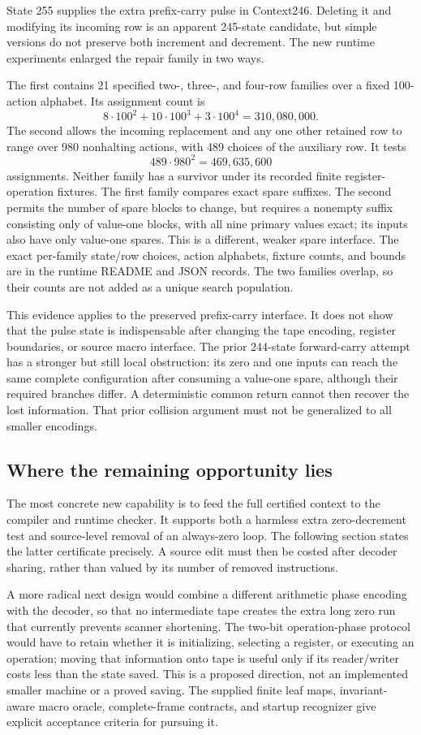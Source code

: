 State 255 supplies the extra prefix-carry pulse in Context246. Deleting
it and modifying its incoming row is an apparent 245-state candidate,
but simple versions do not preserve both increment and decrement. The
new runtime experiments enlarged the repair family in two ways.

The first contains 21 specified two-, three-, and four-row families
over a fixed 100-action alphabet. Its assignment count is
\[
 8\cdot100^2+10\cdot100^3+3\cdot100^4
 =310,080,000.
\]
The second allows the incoming replacement and any one other retained
row to range over 980 nonhalting actions, with 489 choices of the
auxiliary row. It tests
\[
 489\cdot980^2=469,635,600
\]
assignments. Neither family has a survivor under its recorded finite
register-operation fixtures. The first family compares exact spare
suffixes. The second permits the number of spare blocks to change,
but requires a nonempty suffix consisting only of value-one blocks,
with all nine primary values exact; its inputs also have only
value-one spares. This is a different, weaker spare interface. The exact
per-family state/row choices, action alphabets, fixture counts, and
bounds are in the runtime README and JSON records. The two families
overlap, so their counts are not added as a unique search population.

This evidence applies to the preserved prefix-carry interface. It
does not show that the pulse state is indispensable after changing
the tape encoding, register boundaries, or source macro interface.
The prior 244-state forward-carry attempt has a stronger but still
local obstruction: its zero and one inputs can reach the same complete
configuration after consuming a value-one spare, although their
required branches differ. A deterministic common return cannot then
recover the lost information. That prior collision argument must not
be generalized to all smaller encodings.

\subsection{Where the remaining opportunity lies}

The most concrete new capability is to feed the full certified context
to the compiler and runtime checker. It supports both a harmless extra
zero-decrement test and source-level removal of an always-zero loop.
The following section states the latter certificate precisely. A
source edit must then be costed after decoder sharing, rather than
valued by its number of removed instructions.

A more radical next design would combine a different arithmetic phase
encoding with the decoder, so that no intermediate tape creates the
extra long zero run that currently prevents scanner shortening. The
two-bit operation-phase protocol would have to retain whether it is
initializing, selecting a register, or executing an operation; moving
that information onto tape is useful only if its reader/writer costs
less than the state saved. This is a proposed direction, not an
implemented smaller machine or a proved saving. The supplied finite
leaf maps, invariant-aware macro oracle, complete-frame contracts, and
startup recognizer give explicit acceptance criteria for pursuing it.
